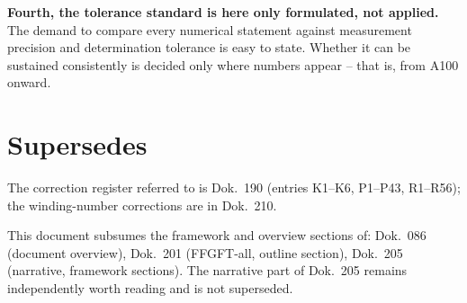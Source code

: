 \textbf{Fourth, the tolerance standard is here only formulated, not applied.}
The demand to compare every numerical statement against measurement precision
and determination tolerance is easy to state. Whether it can be sustained
consistently is decided only where numbers appear -- that is, from A100 onward.

\section{Supersedes}

The correction register referred to is Dok.~190 (entries K1--K6, P1--P43,
R1--R56); the winding-number corrections are in Dok.~210.

This document subsumes the framework and overview sections of: Dok.~086
(document overview), Dok.~201 (FFGFT-all, outline section), Dok.~205
(narrative, framework sections). The narrative part of Dok.~205 remains
independently worth reading and is not superseded.
